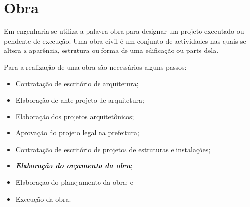 \chapter{Obra}
Em engenharia se utiliza a palavra obra para designar um projeto executado ou pendente de execução. Uma obra civil é um conjunto de actividades nas quais se altera a aparência, estrutura ou forma de uma edificação ou parte dela. \cite{WIKIO}

Para a realização de uma obra são necessários alguns passos:

\begin{itemize}
	\item Contratação de escritório de arquitetura;
	\item Elaboração de ante-projeto de arquitetura;
	\item Elaboração dos projetos arquitetônicos;
	\item Aprovação do projeto legal na prefeitura;
	\item Contratação de escritório de projetos de estruturas e instalações;
	\item \emph{\textbf{Elaboração do orçamento da obra}};
	\item Elaboração do planejamento da obra; e
	\item Execução da obra.
\end{itemize}